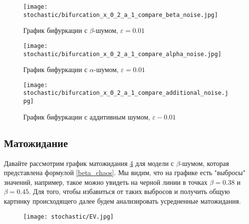         \begin{figure}
            \centering
            \texttt{[image: stochastic/bifurcation\_x\_0\_2\_a\_1\_compare\_beta\_noise.jpg]}
        
            \captionsetup{justification=centering}
            \caption{График бифуркации с \(\beta\)-шумом, \(\varepsilon = 0.01\)}
            \label{bifurcation_x_0_2_a_1_compare_beta_noise}
        \end{figure}

        \begin{figure}
            \centering
            \texttt{[image: stochastic/bifurcation\_x\_0\_2\_a\_1\_compare\_alpha\_noise.jpg]}
        
            \captionsetup{justification=centering}
            \caption{График бифуркации с \(\alpha\)-шумом, \(\varepsilon = 0.01\)}
            \label{bifurcation_x_0_2_a_1_compare_alpha_noise}
        \end{figure}

        \begin{figure}
            \centering
            \texttt{[image: stochastic/bifurcation\_x\_0\_2\_a\_1\_compare\_additional\_noise.jpg]}
        
            \captionsetup{justification=centering}
            \caption{График бифуркации с аддитивным шумом, \(\varepsilon - 0.01\)}
            \label{bifurcation_x_0_2_a_1_compare_additional_noise}
        \end{figure}

    \subsection{Матожидание}


        Давайте рассмотрим график матожидания \ref{EV} для модели с \(\beta\)-шумом, которая представлена формулой \ref{beta_chaos}. Мы видим, что на графике есть "выбросы" значений, например, такое можно увидеть на черной линии в точках \(\beta = 0.38\) и \(\beta = 0.45\). Для того, чтобы избавиться от таких выбросов и получить общую картинку происходящего далее будем анализировать усредненные матожидания.

        
        \begin{figure}
            \centering
            \texttt{[image: stochastic/EV.jpg]}
        
            \captionsetup{justification=centering}
            \caption{}
            \label{EV}
        \end{figure}

